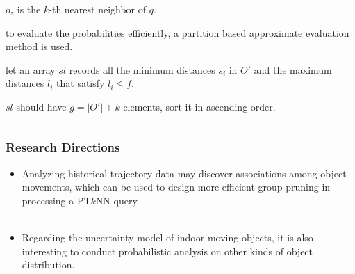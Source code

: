 \begin{frame}
\begin{columns}[c]
  \begin{sitemize}
    \item ${o_z}$ is the ${k}$-th nearest neighbor of ${q}$.
    \item to evaluate the probabilities efficiently, a partition based approximate evaluation method is used.
    \item let an array ${sl}$ records all the minimum distances ${s_i}$ in ${O'}$ and the maximum distances ${l_i}$ that satisfy ${l_i \leq f}$.
    \item ${sl}$ should have ${g = |O'| + k}$ elements, sort it in ascending order.
  \end{sitemize}
\end{columns}

\end{frame}


\begin{frame}
\frametitle{Research Directions}

\begin{itemize}
  \item Analyzing historical trajectory data may discover associations among object movements, which can be used to design more efficient group pruning in processing a PT${k}$NN query
  \\~\\
  \item Regarding the uncertainty model of indoor moving objects, it is also interesting to conduct probabilistic analysis on other kinds of object distribution.
\end{itemize}

\end{frame}
